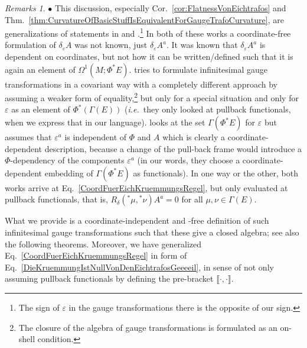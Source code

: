 \documentclass[CM,GP]{degruyter-crelle}       %
\theoremstyle{plain}
\theoremstyle{remark}
\newtheorem{remark}[theorem]{Remarks}
\theoremstyle{definition}
\begin{document}
\begin{remark}\label{RemarkUeberNablaRhoCurvatureForGauegTrafo}
\leavevmode\newline
\indent $\bullet$ This discussion, especially Cor.~\ref{cor:FlatnessVonEichtrafos} and Thm.~\ref{thm:CurvatureOfBasicStuffIsEquivalentForGaugeTrafoCurvature}, are generalizations of statements in \cite[especially Prop.~8 and Thm.~1]{EichtrafoKruemmungUrspruenglich} and \cite[especially Eq.~9, 10 and 11; there the $S$ denotes the basic curvature]{mayerlieAuchEichtrafoStuff}.\footnote{The sign of $\varepsilon$ in the gauge transformations there is the opposite of our sign.} In both of these works a coordinate-free formulation of $\delta_\varepsilon A$ was not known, just $\delta_\varepsilon A^a$. It was known that $\delta_\varepsilon A^a$ is dependent on coordinates, but not how it can be written/defined such that it is again an element of $\Omega^1(M; \Phi^*E)$. \cite{EichtrafoKruemmungUrspruenglich} tries to formulate infinitesimal gauge transformations in a covariant way with a completely different approach by assuming a weaker form of equality,\footnote{The closure of the algebra of gauge transformations is formulated as an on-shell condition.} but only for a special situation and only for $\varepsilon$ as an element of $\Phi^*(\Gamma(E))$ (\textit{i.e.}~they only looked at pullback functionals, when we express that in our language). \cite{mayerlieAuchEichtrafoStuff} looks at the set $\Gamma(\Phi^*E)$ for $\varepsilon$ but assumes that $\varepsilon^a$ is independent of $\Phi$ and $A$ which is clearly a coordinate-dependent description, because a change of the pull-back frame would introduce a $\Phi$-dependency of the components $\varepsilon^a$ (in our words, they choose a coordinate-dependent embedding of $\Gamma(\Phi^*E)$ as functionals). In one way or the other, both works arrive at Eq.~\eqref{CoordFuerEichKruemmungsRegel}, but only evaluated at pullback functionals, that is, $R_\delta({}^*\mu, {}^*\nu)A^a=0$ for all $\mu, \nu \in \Gamma(E)$.

What we provide is a coordinate-independent and -free definition of such infinitesimal gauge transformations such that these give a closed algebra; see also the following theorems. Moreover, we have generalized Eq.~\eqref{CoordFuerEichKruemmungsRegel} in form of Eq.~\eqref{DieKruemmungIstNullVonDenEichtrafosGeeeeil}, in sense of not only assuming pullback functionals by defining the pre-bracket $\llbracket \cdot, \cdot \rrbracket$.


\end{remark}
\end{document}
